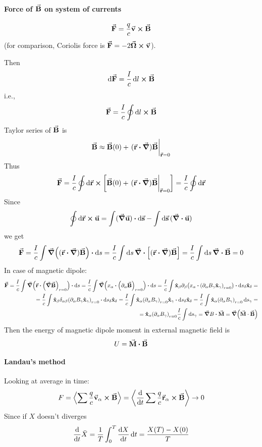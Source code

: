 \paragraph{Force of $\va{B}$ on system of currents}
$$\va{F}= \frac{q}{c} \va{v} \cross \va{B}$$
(for comparison, Coriolis force is $\va{F} = -2 \va{\Omega} \cross \va{v}$).

Then
$$\dd{\va{F}} = \frac{I}{c}\dd{l} \cross \va{B}$$
i.e.,
$$\va{F} = \frac{I}{c}\oint \dd{l} \cross \va{B} $$
Taylor series of $\va{B}$ is
$$\va{B} \approx \va{B}(0) + \eval{(\va{r} \vdot \grad)\va{B}}_{\va{r}=0}$$
Thus 
$$\va{F} = \frac{I}{c} \oint \dd{\va{r}} \cross \qty[\va{B}(0) + \eval{(\va{r} \vdot \grad)\va{B}}_{\va{r}=0}] = \frac{I}{c} \oint \dd{\va{r}} $$
Since
$$\oint \dd{\va{r}} \cross \va{u}= \int (\grad \va{u}) \vdot \dd{\va{s}} - \int \dd{\va{s}} (\div{\va{u}}) $$
we get
$$\va{F} = \frac{I}{c} \int \grad((\va{r} \vdot \grad)\va{B})\vdot \dd{s} = \frac{I}{c} \int \dd{s} \div[(\va{r} \vdot \grad)\va{B}] = \frac{I}{c} \int \dd{s} \div{\va{B}} = 0$$
In case of magnetic dipole:
\begin{align*}
\va{F} = \frac{I}{c} \int  \grad(\va{r} \vdot\qty(  \grad\va{B})_{r=0})\vdot \dd{s} = \frac{I}{c} \int  \grad(x_\alpha \vdot\qty(  \partial_\alpha \va{B})_{r=0})\vdot \dd{s}
= \frac{I}{c} \int  \vu{x}_\beta \partial_\beta\qty(x_\alpha \vdot\qty(  \partial_\alpha B_\gamma \vu{x}_\gamma )_{r=0})\vdot \dd{s_\delta \vu{x}_\delta} 
=\\= \frac{I}{c} \int  \vu{x}_\beta \delta_{\alpha\beta} \qty( \partial_\alpha B_\gamma \vu{x}_\gamma )_{r=0}\vdot \dd{s_\delta \vu{x}_\delta} 
= \frac{I}{c} \int  \vu{x}_\alpha \qty( \partial_\alpha B_\gamma  )_{r=0}\vu{x}_\gamma\vdot \dd{s_\delta \vu{x}_\delta} 
= \frac{I}{c} \int  \vu{x}_\alpha \qty( \partial_\alpha B_\gamma  )_{r=0} \dd{s_\gamma} 
=\\=  \vu{x}_\alpha \qty( \partial_\alpha B_\gamma  )_{r=0} \frac{I}{c} \int  \dd{s_\gamma} = \grad{B} \vdot \va{M}
= \grad(\va{M} \cdot \va{B})
\end{align*}
Then the energy of magnetic dipole moment in external magnetic field is
$$U = \va{M} \vdot \va{B}$$
\paragraph{Landau's method}
Looking at average in time:
$$F = \expval{\sum \frac{q}{c}\va{v}_\alpha \cross \va{B}} = \expval{\dv{t} \sum \frac{q}{c}\va{r}_\alpha \cross \va{B}} \to 0$$
Since if $X$ doesn't diverges
$$\dv{t} \bar{X} = \frac{1}{T} \int_0^T \dv{X}{t} \dd{t} = \frac{X(T)-X(0)}{T} $$

